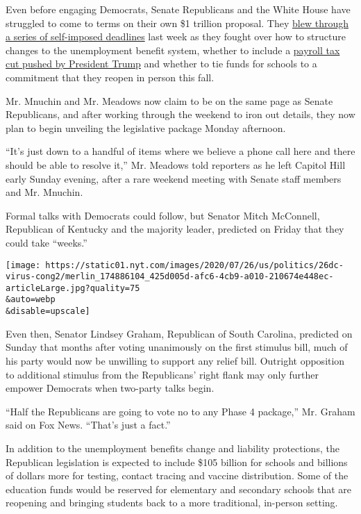 Even before engaging Democrats, Senate Republicans and the White House
have struggled to come to terms on their own \$1 trillion proposal. They
\href{https://www.nytimes.com/2020/07/23/us/politics/republicans-stimulus-coronavirus.html}{blew
through a series of self-imposed deadlines} last week as they fought
over how to structure changes to the unemployment benefit system,
whether to include a
\href{https://www.nytimes.com/2020/07/23/business/payroll-tax-cut-trump-recession.html}{payroll
tax cut pushed by President Trump} and whether to tie funds for schools
to a commitment that they reopen in person this fall.

Mr. Mnuchin and Mr. Meadows now claim to be on the same page as Senate
Republicans, and after working through the weekend to iron out details,
they now plan to begin unveiling the legislative package Monday
afternoon.

``It's just down to a handful of items where we believe a phone call
here and there should be able to resolve it,'' Mr. Meadows told
reporters as he left Capitol Hill early Sunday evening, after a rare
weekend meeting with Senate staff members and Mr. Mnuchin.

Formal talks with Democrats could follow, but Senator Mitch McConnell,
Republican of Kentucky and the majority leader, predicted on Friday that
they could take ``weeks.''

\texttt{[image: https://static01.nyt.com/images/2020/07/26/us/politics/26dc-virus-cong2/merlin\_174886104\_425d005d-afc6-4cb9-a010-210674e448ec-articleLarge.jpg?quality=75\\\&auto=webp\\\&disable=upscale]}

Even then, Senator Lindsey Graham, Republican of South Carolina,
predicted on Sunday that months after voting unanimously on the first
stimulus bill, much of his party would now be unwilling to support any
relief bill. Outright opposition to additional stimulus from the
Republicans' right flank may only further empower Democrats when
two-party talks begin.

``Half the Republicans are going to vote no to any Phase 4 package,''
Mr. Graham said on Fox News. ``That's just a fact.''

In addition to the unemployment benefits change and liability
protections, the Republican legislation is expected to include \$105
billion for schools and billions of dollars more for testing, contact
tracing and vaccine distribution. Some of the education funds would be
reserved for elementary and secondary schools that are reopening and
bringing students back to a more traditional, in-person setting.

